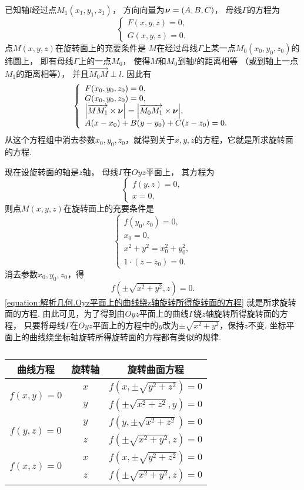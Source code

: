 已知轴\(l\)经过点\(M_1(x_1,y_1,z_1)\)，
方向向量为\(\boldsymbol{\nu}=(A,B,C)\)，
母线\(\Gamma\)的方程为\[
	\left\{ \begin{array}{l}
		F(x,y,z) = 0, \\
		G(x,y,z) = 0.
	\end{array} \right.
\]
点\(M(x,y,z)\)在旋转面上的充要条件是
\(M\)在经过母线\(\Gamma\)上某一点\(M_0(x_0,y_0,z_0)\)的纬圆上，
即有母线\(\Gamma\)上的一点\(M_0\)，
使得\(M\)和\(M_0\)到轴\(l\)的距离相等
（或到轴上一点\(M_1\)的距离相等），
并且\(\vec{M_0 M} \perp l\).
因此有\[
	\left\{ \begin{array}{l}
		F(x_0,y_0,z_0) = 0, \\
		G(x_0,y_0,z_0) = 0, \\
		\abs{\overrightarrow{M M_1} \times \boldsymbol{\nu}} = \abs{\overrightarrow{M_0 M_1} \times \boldsymbol{\nu}}, \\
		A(x-x_0) + B(y-y_0) + C(z-z_0) = 0.
	\end{array} \right.
\]
从这个方程组中消去参数\(x_0,y_0,z_0\)，就得到关于\(x,y,z\)的方程，它就是所求旋转面的方程.

现在设旋转面的轴是\(z\)轴，
母线\(\Gamma\)在\(Oyz\)平面上，
其方程为\[
	\left\{ \begin{array}{l}
		f(y,z) = 0, \\
		x = 0,
	\end{array} \right.
\]
则点\(M(x,y,z)\)在旋转面上的充要条件是\[
	\left\{ \begin{array}{l}
		f(y_0,z_0) = 0, \\
		x_0 = 0, \\
		x^2+y^2=x_0^2+y_0^2, \\
		1\cdot(z-z_0) = 0.
	\end{array} \right.
\]
消去参数\(x_0,y_0,z_0\)，得
\begin{equation}\label{equation:解析几何.Oyz平面上的曲线绕z轴旋转所得旋转面的方程}
	f(\pm\sqrt{x^2+y^2},z) = 0.
\end{equation}
\cref{equation:解析几何.Oyz平面上的曲线绕z轴旋转所得旋转面的方程} 就是所求旋转面的方程.
由此可见，为了得到由\(Oyz\)平面上的曲线\(\Gamma\)绕\(z\)轴旋转所得旋转面的方程，
只要将母线\(\Gamma\)在\(Oyz\)平面上的方程中的\(y\)改为\(\pm\sqrt{x^2+y^2}\)，保持\(z\)不变.
坐标平面上的曲线绕坐标轴旋转所得旋转面的方程都有类似的规律.

\begin{table}[ht]
	\centering
	\begin{tabular}{|c|c|c|}
	\hline
	曲线方程 & 旋转轴 & 旋转曲面方程 \\ \hline
	\multirow{2}{*}{\(f(x,y)=0\)} & \(x\) & \(f(x,\pm\sqrt{y^2+z^2})=0\) \\ \cline{2-3}
		& \(y\) & \(f(\pm\sqrt{x^2+z^2},y)=0\) \\ \hline
	\multirow{2}{*}{\(f(y,z)=0\)} & \(y\) & \(f(y,\pm\sqrt{x^2+z^2})=0\) \\ \cline{2-3}
		& \(z\) & \(f(\pm\sqrt{x^2+y^2},z)=0\) \\ \hline
	\multirow{2}{*}{\(f(x,z)=0\)} & \(x\) & \(f(x,\pm\sqrt{y^2+z^2})=0\) \\ \cline{2-3}
		& \(z\) & \(f(\pm\sqrt{x^2+y^2},z)=0\) \\
	\hline
	\end{tabular}
	\caption{}
\end{table}


